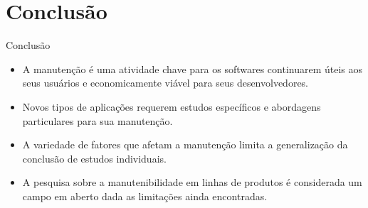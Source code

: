 \section{Conclusão}
\begin{frame}{Conclusão}
    \begin{itemize}
      \item A manutenção é uma atividade chave para os softwares continuarem \alert{úteis} aos seus usuários e 
	economicamente \alert{viável} para seus desenvolvedores.
      
      \item \alert{Novos tipos} de aplicações requerem estudos \alert{específicos} e abordagens \alert{particulares} para 
	sua manutenção.
      \item A \alert{variedade} de fatores que afetam a manutenção \alert{limita a generalização} da conclusão de 
	estudos individuais.
      \item A pesquisa sobre a manutenibilidade em linhas de produtos é considerada um \alert{campo em aberto} dada as 
	limitações ainda encontradas.
    \end{itemize}
\end{frame}
